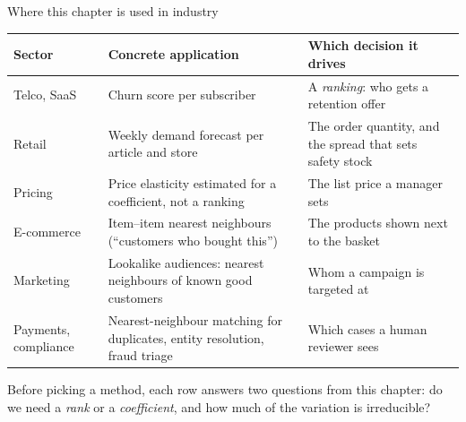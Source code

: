 \documentclass[aspectratio=169,11pt]{beamer}
\begin{document}
\begin{frame}{Where this chapter is used in industry}
  \scriptsize
  \begin{center}
  \begin{tabular}{@{}p{2.2cm}p{6.0cm}p{5.0cm}@{}}
    \toprule
    \textbf{Sector} & \textbf{Concrete application} & \textbf{Which decision it drives} \\
    \midrule
    Telco, SaaS & Churn score per subscriber & A \emph{ranking}: who gets a retention offer \\
    Retail & Weekly demand forecast per article and store & The order quantity, and the spread that sets safety stock \\
    Pricing & Price elasticity estimated for a coefficient, not a ranking & The list price a manager sets \\
    E-commerce & Item--item nearest neighbours (``customers who bought this'') & The products shown next to the basket \\
    Marketing & Lookalike audiences: nearest neighbours of known good customers & Whom a campaign is targeted at \\
    Payments, compliance & Nearest-neighbour matching for duplicates, entity resolution, fraud triage & Which cases a human reviewer sees \\
    \bottomrule
  \end{tabular}
  \end{center}
  \begin{industry}
    Before picking a method, each row answers two questions from this chapter: do we need a
    \emph{rank} or a \emph{coefficient}, and how much of the variation is irreducible?
  \end{industry}
\end{frame}
\end{document}
